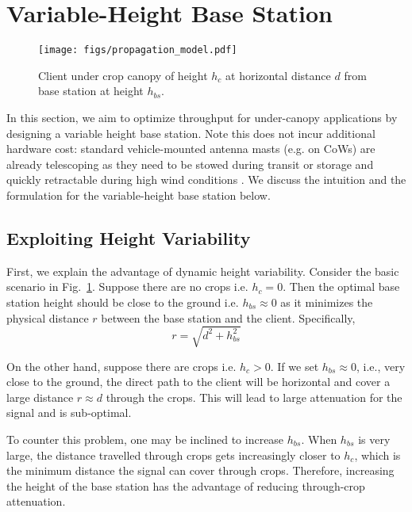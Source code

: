 \section{Variable-Height Base Station}
\label{sec:design}

\begin{figure}[!t]
    \centering
    \texttt{[image: figs/propagation\_model.pdf]}
    \vspace{-0.15in}
    \caption{Client under crop canopy of height $h_c$ at horizontal distance $d$ from base station at height $h_{bs}$.}
    \label{fig:scenario}
    \vspace{-0.15in}
\end{figure}

In this section, we aim to optimize throughput for under-canopy applications by designing a variable height base station. Note this does not incur additional hardware cost: standard vehicle-mounted antenna masts (e.g. on CoWs) are already telescoping as they need to be stowed during transit or storage and quickly retractable during high wind conditions \cite{aluma_smarttower}. We discuss the intuition and the formulation for the variable-height base station below.

\subsection{Exploiting Height Variability} 
First, we explain the advantage of dynamic height variability. Consider the basic scenario in Fig.~\ref{fig:scenario}. Suppose there are no crops i.e. $h_c=0$. Then the optimal base station height should be close to the ground i.e. $h_{bs} \approx 0$ as it minimizes the physical distance $r$ between the base station and the client. Specifically, 
\begin{equation}
r = \sqrt{d^2 + h_{bs}^2}
\end{equation}

On the other hand, suppose there are crops i.e. $h_c > 0$. If we set $h_{bs} \approx 0$, i.e., very close to the ground, the direct path to the client will be horizontal and cover a large distance $r\approx d$ through the crops. This will lead to large attenuation for the signal and is sub-optimal.

To counter this problem, one may be inclined to increase $h_{bs}$. When $h_{bs}$ is very large, the distance travelled through crops gets increasingly closer to $h_c$, which is the minimum distance the signal can cover through crops. Therefore, increasing the height of the base station has the advantage of reducing through-crop attenuation.

